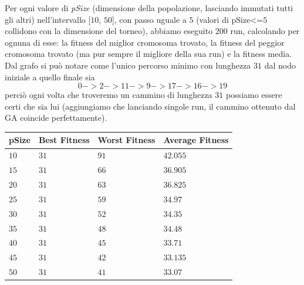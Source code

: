 Per ogni valore di \textit{pSize} (dimensione della popolazione, lasciando immutati tutti gli altri) nell'intervallo [$10$, $50$], con passo uguale a $5$ (valori di pSize<=$5$ collidono con la dimensione del torneo), abbiamo eseguito 200 run, calcolando per ognuna di esse: la fitness del miglior cromosoma trovato, la fitness del peggior cromosoma trovato (ma pur sempre il migliore della sua run) e la fitness media. Dal grafo si pu\`o notare come l'unico percorso minimo con lunghezza $31$ dal nodo iniziale a quello finale sia $$0 -> 2 -> 11 -> 9 -> 17 -> 16-> 19$$ perci\`o ogni volta che troveremo un cammino di lunghezza $31$ possiamo essere certi che sia lui (aggiungiamo che lanciando singole run, il cammino ottenuto dal GA coincide perfettamente).
\begin{center}
\begin{table}[H]
    \centering
    \begin{tabular}{|C{2cm}C{3.25cm}C{3.25cm}C{3.25cm}|}
        \hline
        \textbf{pSize}  & \textbf{Best Fitness} & \textbf{Worst Fitness} & \textbf{Average Fitness} \\ \hline
        
         $10$ &  $31$ &  $91$ &  $42.055$ \\
        
        $15$ & $31$ & $66$ & $36.905$ \\
        
         $20$ &  $31$ &  $63$ &  $36.825$ \\ 
        
        $25$ & $31$ & $59$ & $34.97$ \\
        
         $30$ &  $31$ &  $52$ &  $34.35$ \\
        
        $35$ & $31$ & $48$ & $34.48$ \\
        
         $40$ &  $31$ &  $45$ &  $33.71$ \\
        
        $45$ & $31$ & $42$ & $33.135$ \\
        
         $50$ &  $31$ &  $41$ &  $33.07$ \\
        

\end{tabular}
\end{table}
\end{center}
